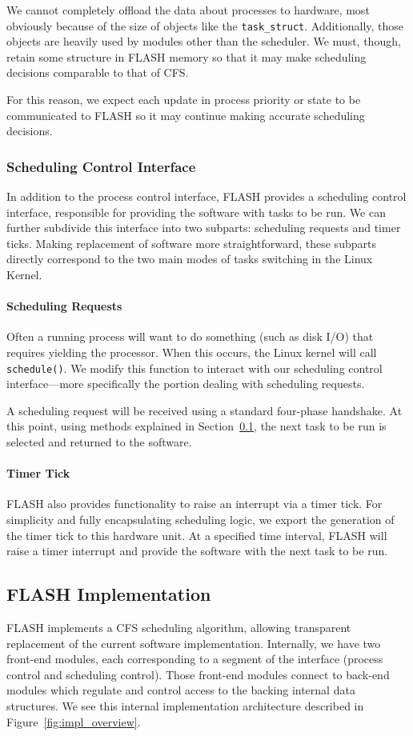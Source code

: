 \documentclass{sig-alternate-10pt}
\newcommand{\ttt}{\texttt}
\begin{document}
We cannot completely offload the data about processes to hardware, most
obviously because of the size of objects like the \ttt{task\_struct}.
Additionally, those objects are heavily used by modules other than the
scheduler.  We must, though, retain some structure in FLASH memory so that
it may make scheduling decisions comparable to that of CFS.

For this reason, we expect each update in process priority or state to be
communicated to FLASH so it may continue making accurate scheduling
decisions.

\subsubsection{Scheduling Control Interface}
In addition to the process control interface, FLASH provides a scheduling
control interface, responsible for providing the software with tasks to be
run.  We can further subdivide this interface into two subparts: scheduling
requests and timer ticks.  Making replacement of software more
straightforward, these subparts directly correspond to the two main modes of
tasks switching in the Linux Kernel.

\paragraph{Scheduling Requests}
Often a running process will want to do something (such as disk I/O) that
requires yielding the processor.  When this occurs, the Linux kernel will
call \texttt{schedule()}.  We modify this function to interact with our
scheduling control interface---more specifically the portion dealing with
scheduling requests.

A scheduling request will be received using a standard four-phase handshake.
At this point, using methods explained in Section~\ref{sec:FLASH_impl}, the
next task to be run is selected and returned to the software.

\paragraph{Timer Tick}
FLASH also provides functionality to raise an interrupt via a timer tick.
For simplicity and fully encapsulating scheduling logic, we export the
generation of the timer tick to this hardware unit.  At a specified time
interval, FLASH will raise a timer interrupt and provide the software with
the next task to be run.

\subsection{FLASH Implementation}
\label{sec:FLASH_impl}
FLASH implements a CFS scheduling algorithm, allowing transparent
replacement of the current software implementation.  Internally, we have two
front-end modules, each corresponding to a segment of the interface (process
control and scheduling control). Those front-end modules connect to back-end
modules which regulate and control access to the backing internal data
structures.  We see this internal implementation architecture described in
Figure~\ref{fig:impl_overview}.
\end{document}
